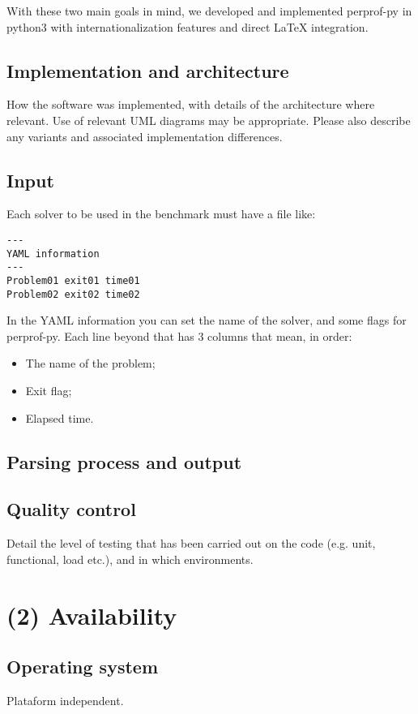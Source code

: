 \documentclass[10pt,a4paper]{article}
\begin{document}
    With these two main goals in mind, we developed and implemented perprof-py in python3 with internationalization features and direct LaTeX integration.

     

\subsection*{Implementation and architecture}
How the software was implemented, with details of the architecture where relevant. Use of relevant UML diagrams may be appropriate. Please also describe any variants and associated implementation differences.

\subsection*{Input}
    Each solver to be used in the benchmark must have a file like:

    \begin{verbatim}
---
YAML information
---
Problem01 exit01 time01
Problem02 exit02 time02
    \end{verbatim}

    In the YAML information you can set the name of the solver, and some
    flags for perprof-py.
    Each line beyond that has 3 columns that mean, in order:
    \begin{itemize}
      \item The name of the problem;
      \item Exit flag;
      \item Elapsed time.
    \end{itemize}

\subsection*{Parsing process and output}

\subsection*{Quality control}
Detail the level of testing that has been carried out on the code (e.g. unit, functional, load etc.), and in which environments. 

\section*{(2) Availability}

\subsection*{Operating system}
Plataform independent.
\end{document}
